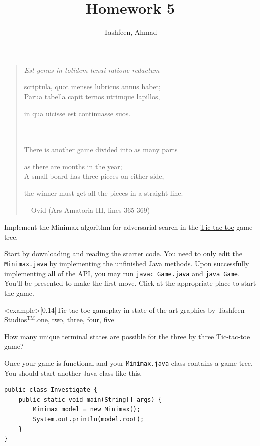 \documentclass{homework}
\author{Tashfeen, Ahmad}
\title{Homework 5}
\begin{document}
 \maketitle

\begin{quote}
{\itshape
Est genus in totidem tenui ratione redactum

scriptula, quot menses lubricus annus habet; \\
Parua tabella capit ternos utrimque lapillos,

in qua uicisse est continuasse suos.}
\\\\
There is another game divided into as many parts

as there are months in the year;\\
A small board has three pieces on either side,

the winner must get all the pieces in a straight line.

\hspace{16em}---Ovid (Ars Amatoria III, lines 365-369)
\end{quote}

\question Implement the Minimax algorithm for adversarial search in the \href{https://en.wikipedia.org/wiki/Tic-tac-toe}{Tic-tac-toe} game tree.

Start by \href{https://tashfeen.org/raw/share/ds/minimax.zip}{downloading} and reading the starter code. You need to only edit the \texttt{Minimax.java} by implementing the unfinished Java methods. Upon successfully implementing all of the API, you may run \texttt{javac Game.java} and \texttt{java Game}. You'll be presented to make the first move.  Click at the appropriate place to start the game.

\img<example>[0.14]{Tic-tac-toe gameplay in state of the art graphics by Tashfeen Studios$^\text{TM}$.}{one, two, three, four, five}


\question\label{un} How many unique terminal states are possible for the three by three Tic-tac-toe game?

\question Once your game is functional and your \texttt{Minimax.java} class contains a game tree.  You should start another Java class like this,
\begin{lstlisting}
public class Investigate {
    public static void main(String[] args) {
        Minimax model = new Minimax();
        System.out.println(model.root);
    }
}
\end{lstlisting}
\end{document}
